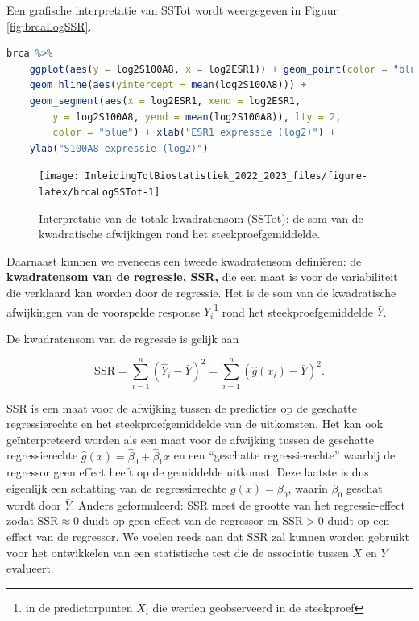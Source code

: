 \documentclass[
  12pt,dutch,coursenotes]{book}
\begin{document}
Een grafische interpretatie van SSTot wordt weergegeven in Figuur \ref{fig:brcaLogSSR}.

\begin{lstlisting}[language=R]
brca %>%
    ggplot(aes(y = log2S100A8, x = log2ESR1)) + geom_point(color = "blue") +
    geom_hline(aes(yintercept = mean(log2S100A8))) +
    geom_segment(aes(x = log2ESR1, xend = log2ESR1,
        y = log2S100A8, yend = mean(log2S100A8)), lty = 2,
        color = "blue") + xlab("ESR1 expressie (log2)") +
    ylab("S100A8 expressie (log2)")
\end{lstlisting}

\begin{figure}

{\centering \texttt{[image: InleidingTotBiostatistiek\_2022\_2023\_files/figure-latex/brcaLogSSTot-1]} 

}

\caption{Interpretatie van de totale kwadratensom (SSTot): de som van de kwadratische afwijkingen rond het steekproefgemiddelde.}\label{fig:brcaLogSSTot}
\end{figure}

Daarnaast kunnen we eveneens een tweede kwadratensom definiëren: de \textbf{kwadratensom van de regressie, SSR,} die een maat is voor de variabiliteit die verklaard kan worden door de regressie. Het is de som van de kwadratische afwijkingen van de voorspelde response \(\hat{Y}_i\)\footnote{in de predictorpunten \(X_i\) die werden geobserveerd in de steekproef} rond het steekproefgemiddelde \(\bar Y\).

De kwadratensom van de regressie is gelijk aan

\[\text{SSR} = \sum_{i=1}^n (\hat{Y}_i - \bar{Y})^2 = \sum_{i=1}^n (\hat{g}(x_i) - \bar{Y})^2.\]

SSR is een maat voor de afwijking tussen de predicties op de geschatte regressierechte en het steekproefgemiddelde van de uitkomsten.
Het kan ook geïnterpreteerd worden als een maat voor de afwijking tussen de geschatte regressierechte \(\hat{g}(x)=\hat\beta_0+\hat\beta_1x\) en een ``geschatte regressierechte'' waarbij de regressor geen effect heeft op de gemiddelde uitkomst.
Deze laatste is dus eigenlijk een schatting van de regressierechte \(g(x)=\beta_0\), waarin \(\beta_0\) geschat wordt door \(\bar{Y}\).
Anders geformuleerd: SSR meet de grootte van het regressie-effect zodat \(\text{SSR} \approx 0\) duidt op geen effect van de regressor en \(\text{SSR}>0\) duidt op een effect van de regressor. We voelen reeds aan dat \(\text{SSR}\) zal kunnen worden gebruikt voor het ontwikkelen van een statistische test die de associatie tussen \(X\) en \(Y\) evalueert.
\end{document}
